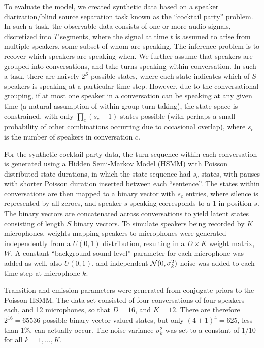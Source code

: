 To evaluate the model, we created synthetic data based on a speaker 
diarization/blind source separation task known as the ``cocktail party'' problem.  
In such a task, the observable data consists of one or more audio signals, discretized into $T$ segments, where the signal at time $t$ is assumed to arise from multiple speakers, some subset of whom are speaking.  The inference problem is to recover which speakers are speaking when.  We further assume that speakers are grouped into conversations, and take turns speaking within conversation.  In such a task, there are naively $2^S$ possible
states, where each state indicates which of $S$ speakers is speaking
at a particular time step.  However, due to the conversational grouping, if
at most one speaker in a conversation can be speaking at any given
time (a natural assumption of within-group turn-taking), 
the state space is constrained, with only $\prod_c (s_c + 1)$
states possible (with perhaps a small probability of other combinations occurring due to occasional overlap), where $s_c$ is the
number of speakers in conversation $c$.

For the synthetic cocktail party data, the turn sequence within each conversation is
generated using a Hidden Semi-Markov Model (HSMM) with Poisson distributed state-durations, in which the state sequence had $s_c$ states, with pauses with
shorter Poisson duration inserted between each ``sentence''.  The
states within conversations are then mapped to a binary vector with
$s_c$ entries, where silence is represented by all zeroes, 
and speaker $s$ speaking corresponds to a 1 in position $s$.  
The binary vectors are concatenated across
conversations to yield latent states consisting of length $S$ binary
vectors.  To simulate speakers being recorded by $K$ microphones,
weights mapping speakers to microphones were generated independently from
a $U(0,1)$ distribution, resulting in a $D \times K$ weight matrix,
$W$.  A constant ``background sound level'' parameter for each microphone was added as
well, also $U(0,1)$, and independent $\mathcal{N}(0,\sigma^2_k)$ noise was added
to each time step at microphone $k$.

Transition and emission parameters were generated from conjugate priors
to the Poisson HSMM.  The data set
consisted of four conversations of four speakers each, and 12
microphones, so that $D = 16$, and $K = 12$.  There are therefore
$2^{16} = 65536$ possible binary vector-valued states, but only
$(4+1)^4 = 625$, less than 1\%, can actually occur.  The noise variance $\sigma^2_k$ 
was set to a constant of $1/10$ for all $k = 1, \dots, K$.

